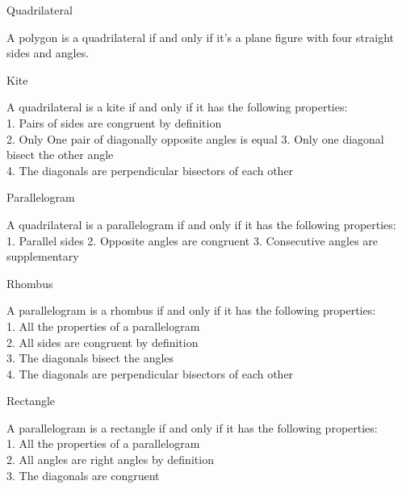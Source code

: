 
\newpage
\begin{tcolorbox}
\begin{definition}
Quadrilateral 

A polygon is a quadrilateral if and only if it's a plane figure with four straight sides and angles. 
\end{definition}


\begin{definition}
Kite 

A quadrilateral is a kite if and only if it has the following properties: \\
1. Pairs of sides are congruent by definition \\
2. Only One pair of diagonally opposite angles is equal
3. Only one diagonal bisect the other angle \\
4. The diagonals are perpendicular bisectors of each other \\
\end{definition}


\begin{definition}
Parallelogram 

A quadrilateral is a parallelogram if and only if it has the following properties: \\
1. Parallel sides
2. Opposite angles are congruent 
3. Consecutive angles are supplementary
\end{definition}


\begin{definition}
Rhombus 

A parallelogram is a rhombus if and only if it has the following properties: \\
1. All the properties of a parallelogram \\
2. All sides are congruent by definition \\
3. The diagonals bisect the angles \\
4. The diagonals are perpendicular bisectors of each other \\
\end{definition}


\begin{definition}
Rectangle 

A parallelogram is a rectangle if and only if it has the following properties: \\
1. All the properties of a parallelogram \\
2. All angles are right angles by definition \\
3. The diagonals are congruent \\
\end{definition}



\end{tcolorbox}
